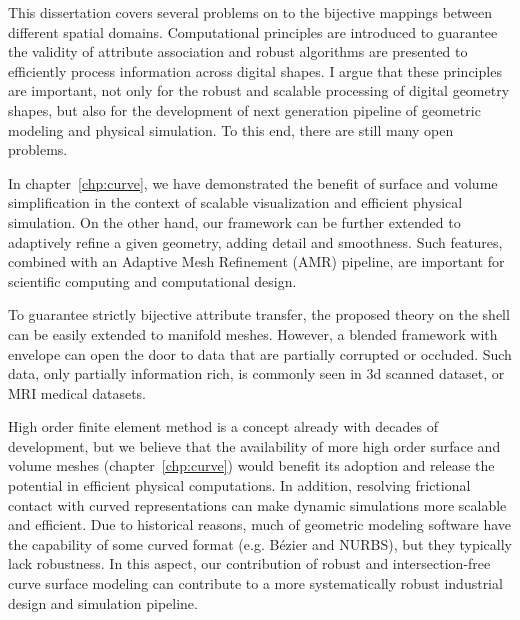 This dissertation covers several problems on to the bijective mappings between different spatial domains. Computational principles are introduced to guarantee the validity of attribute association and robust algorithms are presented to efficiently process information across digital shapes. I argue that these principles are important, not only for the robust and scalable processing of digital geometry shapes, but also for the development of next generation pipeline of geometric modeling and physical simulation. To this end, there are still many open problems.


In chapter~\ref{chp:curve}, we have demonstrated the benefit of surface and volume simplification in the context of scalable visualization and efficient physical simulation. On the other hand, our framework can be further extended to adaptively refine a given geometry, adding detail and smoothness. Such features, combined with an Adaptive Mesh Refinement (AMR) pipeline, are important for scientific computing and computational design.

To guarantee strictly bijective attribute transfer, the proposed theory on the shell can be easily extended to manifold meshes.
However, a blended framework with envelope \cite{hu2018tetrahedral, Wang:2021} can open the door to  data that are partially corrupted or occluded. Such data, only partially information rich, is commonly seen in 3d scanned dataset, or MRI medical datasets.

High order finite element method is a concept already with decades of development, but we believe that the availability of more high order surface and volume meshes (chapter~\ref{chp:curve}) would benefit its adoption and release the potential in efficient physical computations. In addition, resolving frictional contact with curved representations \cite{ferguson2022high} can make dynamic simulations more scalable and efficient. 
Due to historical reasons, much of geometric modeling software have the capability of some curved format (e.g. B{\'e}zier and NURBS), but they typically lack robustness. In this aspect, our contribution of robust and intersection-free curve surface modeling can contribute to a more systematically robust industrial design and simulation pipeline.

